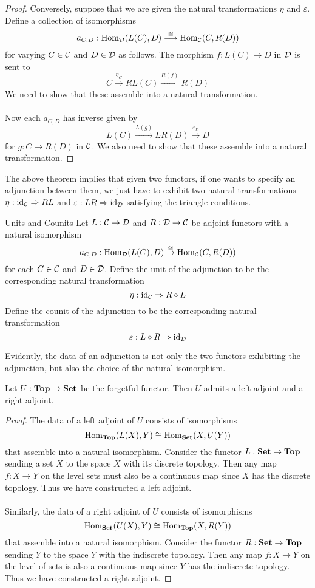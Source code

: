 \documentclass[a4paper]{article}
\begin{document}
\begin{thm}{}{}
\begin{proof}
Conversely, suppose that we are given the natural transformations $\eta$ and $\varepsilon$. Define a collection of isomorphisms $$a_{C,D}:\operatorname{Hom}_{\mathcal{D}}(L(C),D)\overset{\cong}{\longrightarrow}\operatorname{Hom}_{\mathcal{C}}(C,R(D))$$ for varying $C\in\mathcal{C}$ and $D\in\mathcal{D}$ as follows. The morphism $f:L(C)\to D$ in $\mathcal{D}$ is sent to $$C\overset{\eta_C}{\to}RL(C)\overset{R(f)}{\to}R(D)$$ We need to show that these assemble into a natural transformation. \\~\\

Now each $a_{C,D}$ has inverse given by $$L(C)\overset{L(g)}{\to}LR(D)\overset{\varepsilon_D}{\to}D$$ for $g:C\to R(D)$ in $\mathcal{C}$. We also need to show that these assemble into a natural transformation. 
\end{proof}
\end{thm}

The above theorem implies that given two functors, if one wants to specify an adjunction between them, we just have to exhibit two natural transformations $\eta:\text{id}_{\mathcal{C}}\Rightarrow RL$ and $\varepsilon:LR\Rightarrow\text{id}_{\mathcal{D}}$ satisfying the triangle conditions. 

\begin{defn}{Units and Counits}{} Let $L:\mathcal{C}\to\mathcal{D}$ and $R:\mathcal{D}\to\mathcal{C}$ be adjoint functors with a natural isomorphism $$a_{C,D}:\operatorname{Hom}_{\mathcal{D}}(L(C),D)\overset{\cong}{\to}\operatorname{Hom}_{\mathcal{C}}(C,R(D))$$ for each $C\in\mathcal{C}$ and $D\in\mathcal{D}$. Define the unit of the adjunction to be the corresponding natural transformation $$\eta:\text{id}_{\mathcal{C}}\Rightarrow R\circ L$$ Define the counit of the adjunction to be the corresponding natural transformation $$\varepsilon:L\circ R\Rightarrow\text{id}_{\mathcal{D}}$$
\end{defn}

Evidently, the data of an adjunction is not only the two functors exhibiting the adjunction, but also the choice of the natural isomorphism. 

\begin{prp}{}{} Let $U:\bold{Top}\to\bold{Set}$ be the forgetful functor. Then $U$ admits a left adjoint and a right adjoint. \tcbline
\begin{proof}
The data of a left adjoint of $U$ consists of isomorphisms $$\operatorname{Hom}_\bold{Top}(L(X),Y)\cong\operatorname{Hom}_\bold{Set}(X,U(Y))$$ that assemble into a natural isomorphism. Consider the functor $L:\bold{Set}\to\bold{Top}$ sending a set $X$ to the space $X$ with its discrete topology. Then any map $f:X\to Y$ on the level sets must also be a continuous map since $X$ has the discrete topology. Thus we have constructed a left adjoint. \\~\\

Similarly, the data of a right adjoint of $U$ consists of isomorphisms $$\operatorname{Hom}_\bold{Set}(U(X),Y)\cong\operatorname{Hom}_\bold{Top}(X,R(Y))$$ that assemble into a natural isomorphism. Consider the functor $R:\bold{Set}\to\bold{Top}$ sending $Y$ to the space $Y$ with the indiscrete topology. Then any map $f:X\to Y$ on the level of sets is also a continuous map since $Y$ has the indiscrete topology. Thus we have constructed a right adjoint. 
\end{proof}
\end{prp}
\end{document}
